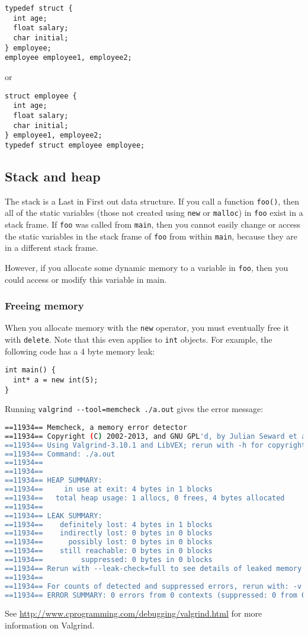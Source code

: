 \documentclass[a4paper,12pt]{article}
\begin{document}
\begin{lstlisting}
typedef struct {
  int age;
  float salary;
  char initial;
} employee;
employee employee1, employee2;
\end{lstlisting}

or

\begin{lstlisting}
struct employee {
  int age;
  float salary;
  char initial;
} employee1, employee2;
typedef struct employee employee;
\end{lstlisting}
\subsection{Stack and heap}
The stack is a Last in First out data structure. If you call a function \lstinline|foo()|, then all of the static variables (those not created using \lstinline|new| or \lstinline|malloc|) in \lstinline|foo| exist in a stack frame. If \lstinline|foo| was called from \lstinline|main|, then you cannot easily change or access the static variables in the stack frame of \lstinline|foo| from within \lstinline|main|, because they are in a different stack frame.

However, if you allocate some dynamic memory to a variable in \lstinline|foo|, then you could access or modify this variable in main.
\subsubsection{Freeing memory}
When you allocate memory with the \lstinline|new| operator, you must eventually free it with \lstinline|delete|. Note that this even applies to \lstinline|int| objects. For example, the following code has a 4 byte memory leak:

\begin{lstlisting}[caption={Memory leak}]
int main() {
  int* a = new int(5);
}
\end{lstlisting}

Running \lstinline|valgrind --tool=memcheck ./a.out| gives the error message:
\begin{lstlisting}[language=bash, caption={Valgrind output}]
==11934== Memcheck, a memory error detector
==11934== Copyright (C) 2002-2013, and GNU GPL'd, by Julian Seward et al.
==11934== Using Valgrind-3.10.1 and LibVEX; rerun with -h for copyright info
==11934== Command: ./a.out
==11934== 
==11934== 
==11934== HEAP SUMMARY:
==11934==     in use at exit: 4 bytes in 1 blocks
==11934==   total heap usage: 1 allocs, 0 frees, 4 bytes allocated
==11934== 
==11934== LEAK SUMMARY:
==11934==    definitely lost: 4 bytes in 1 blocks
==11934==    indirectly lost: 0 bytes in 0 blocks
==11934==      possibly lost: 0 bytes in 0 blocks
==11934==    still reachable: 0 bytes in 0 blocks
==11934==         suppressed: 0 bytes in 0 blocks
==11934== Rerun with --leak-check=full to see details of leaked memory
==11934== 
==11934== For counts of detected and suppressed errors, rerun with: -v
==11934== ERROR SUMMARY: 0 errors from 0 contexts (suppressed: 0 from 0)
\end{lstlisting}
See \url{http://www.cprogramming.com/debugging/valgrind.html} for more information on Valgrind.
\end{document}
